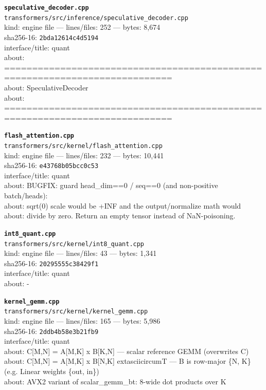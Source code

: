 \noindent\textbf{\texttt{speculative\_decoder.cpp}}\\
\texttt{transformers/src/inference/speculative\_decoder.cpp}\\
kind: engine file --- lines/files: 252 --- bytes: 8,674\\
sha256-16: \texttt{2bda12614c4d5194}\\
interface/title: quant\\
about: ============================================================================\\
about: SpeculativeDecoder\\
about: ============================================================================\\
\vspace*{6.0pt}

\noindent\textbf{\texttt{flash\_attention.cpp}}\\
\texttt{transformers/src/kernel/flash\_attention.cpp}\\
kind: engine file --- lines/files: 232 --- bytes: 10,441\\
sha256-16: \texttt{e43768b05bcc0c53}\\
interface/title: quant\\
about: BUGFIX: guard head\_dim==0 / seq==0 (and non-positive batch/heads):\\
about: sqrt(0) scale would be +INF and the output/normalize math would\\
about: divide by zero. Return an empty tensor instead of NaN-poisoning.\\
\vspace*{6.0pt}
\newpage

\noindent\textbf{\texttt{int8\_quant.cpp}}\\
\texttt{transformers/src/kernel/int8\_quant.cpp}\\
kind: engine file --- lines/files: 43 --- bytes: 1,341\\
sha256-16: \texttt{20295555c38429f1}\\
interface/title: quant\\
about: -\\
\vspace*{6.0pt}

\noindent\textbf{\texttt{kernel\_gemm.cpp}}\\
\texttt{transformers/src/kernel/kernel\_gemm.cpp}\\
kind: engine file --- lines/files: 165 --- bytes: 5,986\\
sha256-16: \texttt{2ddb4b58e3b21fb9}\\
interface/title: quant\\
about: C[M,N] = A[M,K] x B[K,N] — scalar reference GEMM (overwrites C)\\
about: C[M,N] = A[M,K] x B[N,K]	extasciicircum{}T — B is row-major \{N, K\} (e.g. Linear weights \{out, in\})\\
about: AVX2 variant of scalar\_gemm\_bt: 8-wide dot products over K\\
\vspace*{6.0pt}

